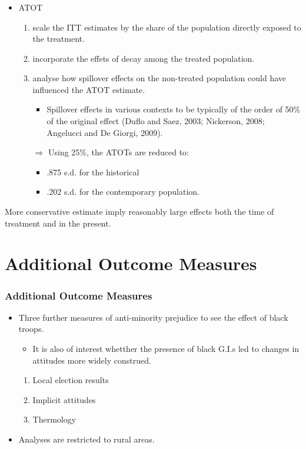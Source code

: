 \documentclass[dvipdfmx,11pt]{beamer}
\begin{document}
\begin{frame}\frametitle{}
  \begin{itemize}
    \item ATOT
    \begin{enumerate}
      \item scale the ITT estimates by the share of the population directly exposed to the treatment.

      \item incorporate the effets of decay among the treated population.

      \item analyse how spillover effects on the non-treated population could have influenced the ATOT estimate.
      \begin{itemize}
        \item Spillover effects in various contexts to be typically of the order of 50\% of the original effect (Duflo and Saez, 2003; Nickerson, 2008; Angelucci and De Giorgi, 2009).
      \end{itemize}
      $\Rightarrow$ Using 25\%, the ATOTs are reduced to:
      \begin{itemize}
        \item .875 s.d. for the historical
        \item .202 s.d. for the contemporary population.
      \end{itemize}
    \end{enumerate}
  \end{itemize}
  More conservative estimate imply reasonably large effects both the time of treatment and in the present.
\end{frame}

\section{Additional Outcome Measures}
\frame{\sectionpage}
\begin{frame}\frametitle{Additional Outcome Measures}
  \begin{itemize}
    \item Three further measures of anti-minority prejudice to see the effect of black troops.
    \begin{itemize}
      \item It is also of interest whetther the presence of black G.I.s led to changes in attitudes more widely construed.
    \end{itemize}
    \begin{enumerate}
      \item Local election results
      \item Implicit attitudes
      \item Thermology
    \end{enumerate}
    \item Analyses are restricted to rural areas.
  \end{itemize}
\end{frame}
\end{document}
